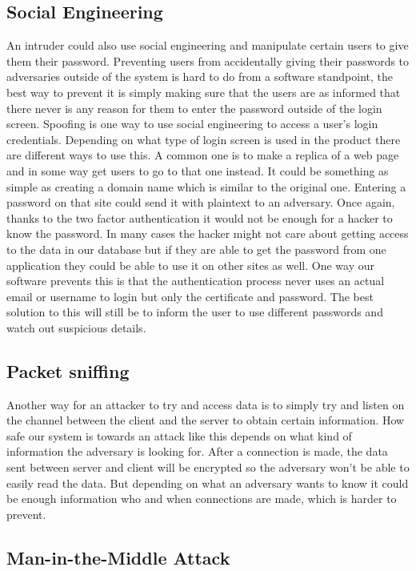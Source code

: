 \documentclass{article}
\begin{document}
\subsection*{Social Engineering}

An intruder could also use social engineering and manipulate certain users to give them their password. Preventing users from accidentally giving their passwords to adversaries outside of the system is hard to do from a software standpoint, the best way to prevent it is simply making sure that the users are as informed that there never is any reason for them to enter the password outside of the login screen. Spoofing is one way to use social engineering to access a user’s login credentials. Depending on what type of login screen is used in the product there are different ways to use this. A common one is to make a replica of a web page and in some way get users to go to that one instead. It could be something as simple as creating a domain name which is similar to the original one. Entering a password on that site could send it with plaintext to an adversary. Once again, thanks to the two factor authentication it would not be enough for a hacker to know the password. In many cases the hacker might not care about getting access to the data in our database but if they are able to get the password from one application they could be able to use it on other sites as well. One way our software prevents this is that the authentication process never uses an actual email or username to login but only the certificate and password. The best solution to this will still be to inform the user to use different passwords and watch out suspicious details.

\subsection*{Packet sniffing}

Another way for an attacker to try and access data is to simply try and listen on the channel between the client and the server to obtain certain information\cite[p.229]{stalbrown}. How safe our system is towards an attack like this depends on what kind of information the adversary is looking for. After a connection is made, the data sent between server and client will be encrypted so the adversary won’t be able to easily read the data. But depending on what an adversary wants to know it could be enough information who and when connections are made, which is harder to prevent.

\subsection*{Man-in-the-Middle Attack}
\end{document}
